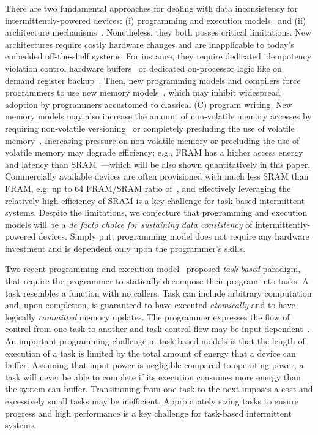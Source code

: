 
There are two fundamental approaches for dealing with data inconsistency for intermittently-powered devices: (i) programming and execution models~\cite{dino,ratchet,chain,alpaca} and (ii) architecture mechanisms~\cite{hicks_isca_2017,idetic,nvp}. Nonetheless, they both posses critical limitations. New architectures require costly hardware changes and are inapplicable to today's embedded off-the-shelf systems. For instance, they require dedicated idempotency violation control hardware buffers~\cite[Fig. 3]{hicks_isca_2017} or dedicated on-processor logic like on demand register backup~\cite[Fig. 9]{nvp}. Then, new programming models and compilers force programmers to use new memory models~\cite{chain,ratchet}, which may inhibit widespread adoption by programmers accustomed to classical (C) program writing. New memory models may also increase the amount of non-volatile memory accesses by requiring non-volatile versioning~\cite{chain} or completely precluding the use of volatile memory~\cite{ratchet}. Increasing pressure on non-volatile memory or precluding the use of volatile memory may degrade efficiency; e.g., FRAM has a higher access energy and latency than SRAM~\cite[Fig. 4]{nvp}---which will be also shown quantitatively in this paper. Commercially available devices are often provisioned with much less SRAM than FRAM, e.g. up to 64 FRAM/SRAM ratio of~\cite{wolverine}, and effectively leveraging the relatively high efficiency of SRAM is a key challenge for task-based intermittent systems. Despite the limitations, we conjecture that programming and execution models will be a {\em de facto choice for sustaining data consistency} of intermittently-powered devices. Simply put, programming model does not require any hardware investment and is dependent only upon the programmer's skills.


Two recent programming and execution model~\cite{alpaca,chain} proposed {\em task-based} paradigm, that require the programmer to statically decompose their program into tasks. A task resembles a function with no callers. Task can include arbitrary computation and, upon completion, is guaranteed to have executed {\em atomically} and to have logically {\em committed} memory updates. The programmer expresses the flow of control from one task to another and task control-flow may be input-dependent~\cite[Fig. 4]{chain}. An important programming challenge in task-based models is that the length of execution of a task is limited by the total amount of energy that a device can buffer. Assuming that input power is negligible compared to operating power, a task will never be able to complete if its execution consumes more energy than the system can buffer. Transitioning from one task to the next imposes a cost and excessively small tasks may be inefficient. Appropriately sizing tasks to ensure progress and high performance is a key challenge for task-based intermittent systems.


